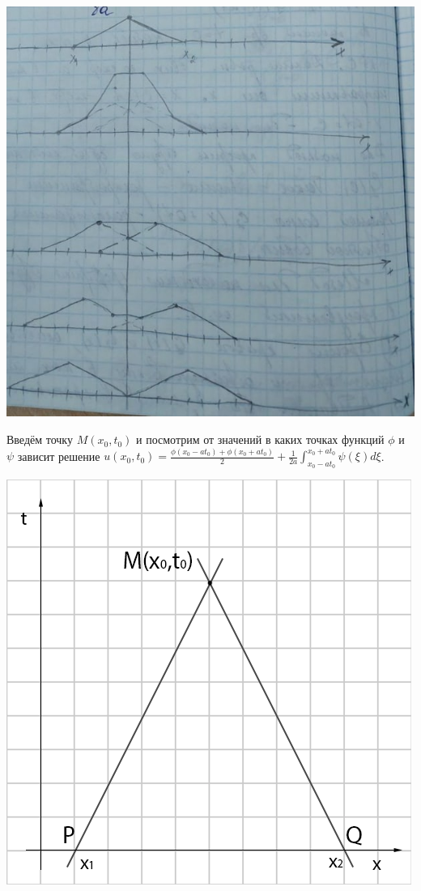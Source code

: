 \documentclass[../main.tex]{subfiles}
\begin{document}
\includegraphics[scale=0.5]{graph_1.jpg}

Введём точку $M(x_0, t_0)$ и посмотрим от значений в каких точках функций
$\phi$ и $\psi$ зависит решение $u(x_0, t_0) = \frac{\phi(x_0-at_0) + \phi(x_0+at_0)}{2} + \frac{1}{2a}\int_{x_0-at_0}^{x_0+at_0}\psi(\xi)d\xi$.

\includegraphics[scale=0.5]{2.5_2.png}
\end{document}
